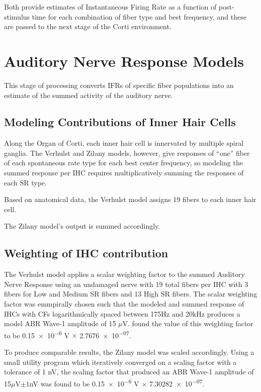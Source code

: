 Both provide estimates of Instantaneous Firing Rate as a function of post-stimulus time for each combination of fiber type and best frequency, and these are passed to the next stage of the Corti environment.


\section{Auditory Nerve Response Models} %
\label{sec:auditory_nerve_response_models}
This stage of processing converts IFRs of specific fiber populations into an estimate of the summed activity of the auditory nerve. 

\subsection{Modeling Contributions of Inner Hair Cells} %
\label{sub:contributions_to_the_response_by_inner_hair_cells}
Along the Organ of Corti, each inner hair cell is innervated by multiple spiral ganglia.  The Verhulst and Zilany models, however, give responses of ``one'' fiber of each spontaneous rate type for each best center frequency, so modeling the summed response per IHC requires multiplicatively summing the responses of each SR type. 

Based on anatomical data, the Verhulst model assigns 19 fibers to each inner hair cell.  

The Zilany model's output is summed accordingly. 
\subsection{Weighting of IHC contribution} %
\label{sub:weighting_of_ihc_contribution}
The Verhulst model applies a scalar weighting factor to the summed Auditory Nerve Response using an undamaged nerve with 19 total fibers per IHC with 3 fibers for Low and Medium SR fibers and 13 High SR fibers. The scalar weighting factor was emmpirally chosen such that the modeled and summed response of IHCs with CFs logarithmically spaced between 175Hz and 20kHz produces a model ABR Wave-1 amplitude of 15 $\mu$V.  \citeauthor{Verhulst2015Functional} found the value of this weighting factor to be \num{0.15e-6} V $\times$ \num{2.7676e-07}.

To produce comparable results, the Zilany model was scaled accordingly. Using a small utility program which iteratively converged on a scaling factor with a tolerance of 1 nV, the scaling factor that produced an ABR Wave-1 amplitude of 15$\mu$V$\pm 1$nV was found to be \num{0.15e-6} V $\times$ \num{7.30282e-07}.


